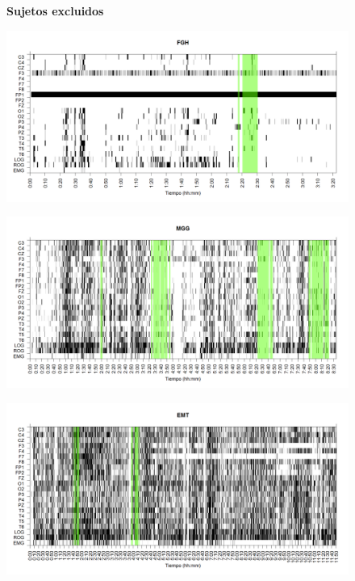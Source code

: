 \documentclass[12pt,a4paper]{mitthesis}
\begin{document}
\begin{figure}
\Large{\textbf{Sujetos excluidos}}
\end{figure}

\begin{figure}
\centering
\includegraphics[width=0.8\linewidth]
{./g170413/FGHSUE_est.png} 
\label{grf_FGH}
\end{figure}

\begin{figure}
\centering
\includegraphics[width=0.8\linewidth]
{./g170413/MGNA5SUE_est.png} 
\label{grf_MGG}
\end{figure}

\begin{figure}
\centering
\includegraphics[width=0.8\linewidth]
{./g170413/EMNNS_est.png} 
\label{grf_EMT}
\end{figure}

\end{document}
